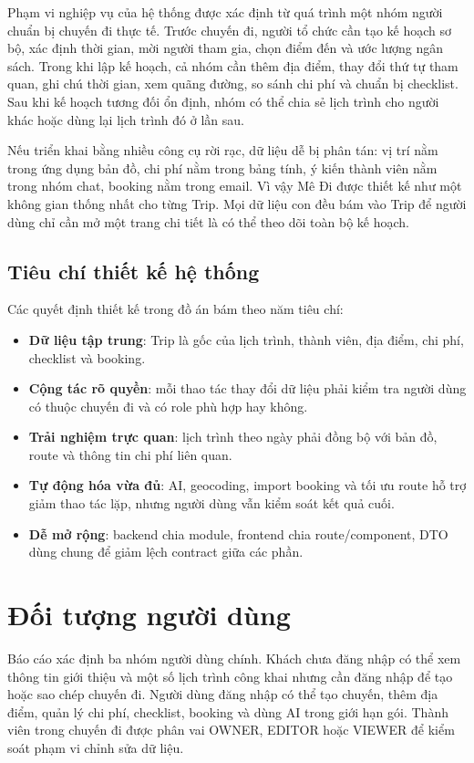 \documentclass[a4paper]{report}
\newcommand{\ProjectName}{Mê Đi}
\begin{document}
Phạm vi nghiệp vụ của hệ thống được xác định từ quá trình một nhóm người chuẩn bị chuyến đi thực tế. Trước chuyến đi, người tổ chức cần tạo kế hoạch sơ bộ, xác định thời gian, mời người tham gia, chọn điểm đến và ước lượng ngân sách. Trong khi lập kế hoạch, cả nhóm cần thêm địa điểm, thay đổi thứ tự tham quan, ghi chú thời gian, xem quãng đường, so sánh chi phí và chuẩn bị checklist. Sau khi kế hoạch tương đối ổn định, nhóm có thể chia sẻ lịch trình cho người khác hoặc dùng lại lịch trình đó ở lần sau.

Nếu triển khai bằng nhiều công cụ rời rạc, dữ liệu dễ bị phân tán: vị trí nằm trong ứng dụng bản đồ, chi phí nằm trong bảng tính, ý kiến thành viên nằm trong nhóm chat, booking nằm trong email. Vì vậy \ProjectName{} được thiết kế như một không gian thống nhất cho từng Trip. Mọi dữ liệu con đều bám vào Trip để người dùng chỉ cần mở một trang chi tiết là có thể theo dõi toàn bộ kế hoạch.

\subsection{Tiêu chí thiết kế hệ thống}

Các quyết định thiết kế trong đồ án bám theo năm tiêu chí:

\begin{itemize}
  \item \textbf{Dữ liệu tập trung}: Trip là gốc của lịch trình, thành viên, địa điểm, chi phí, checklist và booking.
  \item \textbf{Cộng tác rõ quyền}: mỗi thao tác thay đổi dữ liệu phải kiểm tra người dùng có thuộc chuyến đi và có role phù hợp hay không.
  \item \textbf{Trải nghiệm trực quan}: lịch trình theo ngày phải đồng bộ với bản đồ, route và thông tin chi phí liên quan.
  \item \textbf{Tự động hóa vừa đủ}: AI, geocoding, import booking và tối ưu route hỗ trợ giảm thao tác lặp, nhưng người dùng vẫn kiểm soát kết quả cuối.
  \item \textbf{Dễ mở rộng}: backend chia module, frontend chia route/component, DTO dùng chung để giảm lệch contract giữa các phần.
\end{itemize}

\section{Đối tượng người dùng}

Báo cáo xác định ba nhóm người dùng chính. Khách chưa đăng nhập có thể xem thông tin giới thiệu và một số lịch trình công khai nhưng cần đăng nhập để tạo hoặc sao chép chuyến đi. Người dùng đăng nhập có thể tạo chuyến, thêm địa điểm, quản lý chi phí, checklist, booking và dùng AI trong giới hạn gói. Thành viên trong chuyến đi được phân vai OWNER, EDITOR hoặc VIEWER để kiểm soát phạm vi chỉnh sửa dữ liệu.
\end{document}
